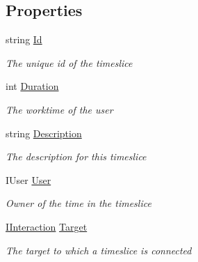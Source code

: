 \subsection*{Properties}
\begin{DoxyCompactItemize}
\item 
string \hyperlink{class_plex_byte_1_1_mo_cap_1_1_interactions_1_1_timeslice_ad98eba507161ca5571fdfa56d03c22ab}{Id}
\begin{DoxyCompactList}\small\item\em The unique id of the timeslice \end{DoxyCompactList}\item 
int \hyperlink{class_plex_byte_1_1_mo_cap_1_1_interactions_1_1_timeslice_ad5f08401972f9e23eb9afb0ff1ccfbd6}{Duration}
\begin{DoxyCompactList}\small\item\em The worktime of the user \end{DoxyCompactList}\item 
string \hyperlink{class_plex_byte_1_1_mo_cap_1_1_interactions_1_1_timeslice_a27e3e7780a2a7fcb05d20418785d16a5}{Description}
\begin{DoxyCompactList}\small\item\em The description for this timeslice \end{DoxyCompactList}\item 
I\+User \hyperlink{class_plex_byte_1_1_mo_cap_1_1_interactions_1_1_timeslice_aa4ece3cd52590ebbf1c8b27756994a9d}{User}
\begin{DoxyCompactList}\small\item\em Owner of the time in the timeslice \end{DoxyCompactList}\item 
\hyperlink{interface_plex_byte_1_1_mo_cap_1_1_interactions_1_1_i_interaction}{I\+Interaction} \hyperlink{class_plex_byte_1_1_mo_cap_1_1_interactions_1_1_timeslice_a80b536958a41037922f51026651aafed}{Target}
\begin{DoxyCompactList}\small\item\em The target to which a timeslice is connected \end{DoxyCompactList}\item 

\end{DoxyCompactItemize}
